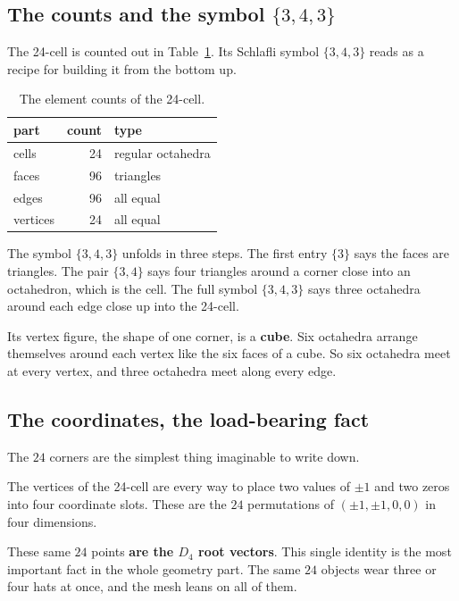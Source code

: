 \subsection{The counts and the symbol $\{3,4,3\}$}

The 24-cell is counted out in Table~\ref{tab:24cell-counts}. Its Schlafli symbol $\{3,4,3\}$ reads as a recipe for building it from the bottom up.

\begin{table}[ht]
\centering
\begin{tabular}{@{}lrl@{}}
\toprule
part & count & type \\
\midrule
cells & 24 & regular octahedra \\
faces & 96 & triangles \\
edges & 96 & all equal \\
vertices & 24 & all equal \\
\bottomrule
\end{tabular}
\caption{The element counts of the 24-cell.}
\label{tab:24cell-counts}
\end{table}

The symbol $\{3,4,3\}$ unfolds in three steps. The first entry $\{3\}$ says the faces are triangles. The pair $\{3,4\}$ says four triangles around a corner close into an octahedron, which is the cell. The full symbol $\{3,4,3\}$ says three octahedra around each edge close up into the 24-cell.

Its vertex figure, the shape of one corner, is a \textbf{cube}. Six octahedra arrange themselves around each vertex like the six faces of a cube. So six octahedra meet at every vertex, and three octahedra meet along every edge.

\subsection{The coordinates, the load-bearing fact}

The $24$ corners are the simplest thing imaginable to write down.

\begin{definition}
The vertices of the 24-cell are every way to place two values of $\pm 1$ and two zeros into four coordinate slots. These are the $24$ permutations of $(\pm 1, \pm 1, 0, 0)$ in four dimensions.
\end{definition}

These same $24$ points \textbf{are the $D_4$ root vectors}. This single identity is the most important fact in the whole geometry part. The same $24$ objects wear three or four hats at once, and the mesh leans on all of them.

